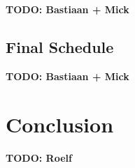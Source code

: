 \documentclass{article}
\theoremstyle{definition}
\newcommand{\TODO}[1]{{\color{red}\textbf{TODO: #1}}}
\begin{document}
\TODO{Bastiaan + Mick}

\subsection{Final Schedule}

\TODO{Bastiaan + Mick}


\newpage


\section{Conclusion}

\TODO{Roelf}



\newpage


\end{document}
